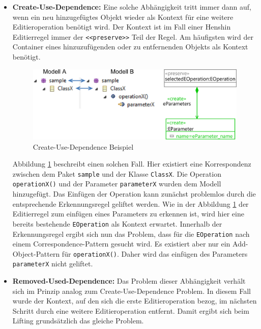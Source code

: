 \begin{itemize}
  \item \textbf{Create-Use-Dependence:} Eine solche Abhängigkeit tritt immer dann auf, wenn ein
  neu hinzugefügtes Objekt wieder als Kontext für eine weitere Editieroperation benötigt wird. Der
  Kontext ist im Fall einer Henshin Editierregel immer der \texttt{<<preserve>>} Teil der Regel. Am
  häufigsten wird der Container eines hinzuzufügenden oder zu entfernenden Objekts als Kontext
  benötigt.
  
  \begin{figure}[htbp]
    \centering
    \includegraphics[scale=1.4]{images/create-use-dependence.png}
    \caption{Create-Use-Dependence Beispiel}
    \label{fig:create-use-dependence}
  \end{figure}
  
  Abbildung \ref{fig:create-use-dependence} beschreibt einen solchen Fall. Hier existiert eine
  Korrespondenz zwischen dem Paket \texttt{sample} und der Klasse \texttt{ClassX}. Die Operation
  \texttt{operationX()} und der Parameter \texttt{parameterX} wurden dem Modell hinzugefügt. Das
  Einfügen der Operation kann zunächst problemlos durch die entsprechende Erkennungsregel geliftet
  werden. Wie in der Abbildung \ref{fig:create-use-dependence} der Editierregel zum einfügen eines
  Parameters zu erkennen ist, wird hier eine bereits bestehende \texttt{EOperation} als Kontext
  erwartet. Innerhalb der Erkennungsregel ergibt sich nun das Problem, dass für die
  \texttt{EOperation} nach einem Correspondence-Pattern gesucht wird. Es existiert aber nur ein
  Add-Object-Pattern für \texttt{operationX()}. Daher wird das einfügen des Parameters  
  \texttt{parameterX} nicht geliftet.
  

\item \textbf{Removed-Used-Dependence:} Das Problem dieser Abhängigkeit verhält sich im Prinzip
analog zum Create-Use-Dependence Problem. In diesem Fall wurde der Kontext, auf den sich die
erste Editieroperation bezog, im nächsten Schritt durch eine weitere Editieroperation entfernt.
Damit ergibt sich beim Lifting grundsätzlich das gleiche Problem.


\end{itemize}
